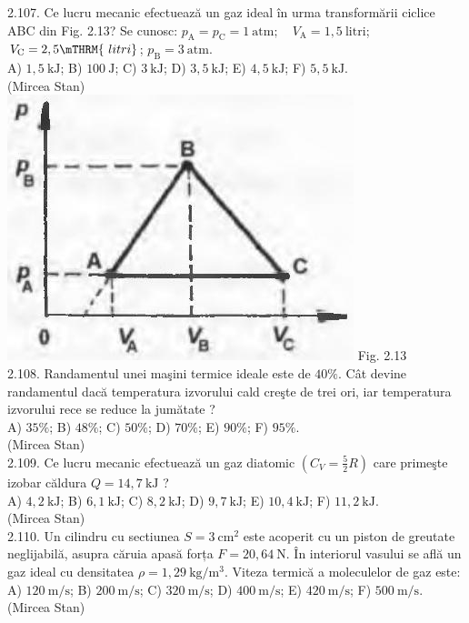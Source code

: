2.107. Ce lucru mecanic efectuează un gaz ideal în urma transformării ciclice ABC din Fig. 2.13? Se cunosc: $p_{\mathrm{A}}=p_{\mathrm{C}}=1 \mathrm{~atm} ; \quad V_{\mathrm{A}}=1,5 \mathrm{~litri}$; $V_{\mathrm{C}}=2,5 \mTHRM{~litri}$; $p_{\mathrm{B}}=3 \mathrm{~atm}$.\\ A) $1,5 \mathrm{~kJ}$; B) $100 \mathrm{~J}$; C) $3 \mathrm{~kJ}$; D) $3,5 \mathrm{~kJ}$; E) $4,5 \mathrm{~kJ}$; F) $5,5 \mathrm{~kJ}$.\\ (Mircea Stan)\\ \includegraphics[width=0.4\linewidth]{images/2025_07_01_5b3ff9fa0d508c8e9f17g-097} Fig. 2.13\\

2.108. Randamentul unei maşini termice ideale este de $40 \%$. Cât devine randamentul dacă temperatura izvorului cald creşte de trei ori, iar temperatura izvorului rece se reduce la jumătate ?\\ A) $35 \%$; B) $48 \%$; C) $50 \%$; D) $70 \%$; E) $90 \%$; F) $95 \%$.\\ (Mircea Stan)\\

2.109. Ce lucru mecanic efectuează un gaz diatomic $\left(C_{V}=\frac{5}{2} R\right)$ care primeşte izobar căldura $Q=14,7 \mathrm{~kJ}$ ?\\ A) $4,2 \mathrm{~kJ}$; B) $6,1 \mathrm{~kJ}$; C) $8,2 \mathrm{~kJ}$; D) $9,7 \mathrm{~kJ}$; E) $10,4 \mathrm{~kJ}$; F) $11,2 \mathrm{~kJ}$.\\ (Mircea Stan)\\

2.110. Un cilindru cu sectiunea $S=3 \mathrm{~cm}^{2}$ este acoperit cu un piston de greutate neglijabilă, asupra căruia apasă forța $F=20,64 \mathrm{~N}$. În interiorul vasului se află un gaz ideal cu densitatea $\rho=1,29 \mathrm{~kg} / \mathrm{m}^{3}$. Viteza termică a moleculelor de gaz este:\\ A) $120 \mathrm{~m} / \mathrm{s}$; B) $200 \mathrm{~m} / \mathrm{s}$; C) $320 \mathrm{~m} / \mathrm{s}$; D) $400 \mathrm{~m} / \mathrm{s}$; E) $420 \mathrm{~m} / \mathrm{s}$; F) $500 \mathrm{~m} / \mathrm{s}$.\\ (Mircea Stan)\\

